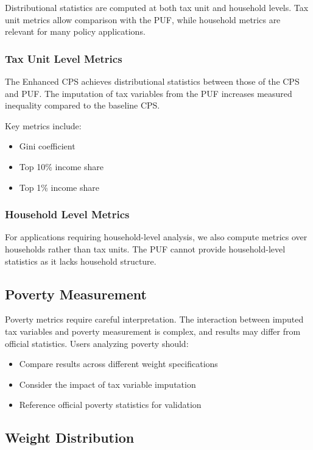 Distributional statistics are computed at both tax unit and household levels. Tax unit metrics allow comparison with the PUF, while household metrics are relevant for many policy applications.

\subsubsection{Tax Unit Level Metrics}

The Enhanced CPS achieves distributional statistics between those of the CPS and PUF. The imputation of tax variables from the PUF increases measured inequality compared to the baseline CPS.

Key metrics include:
\begin{itemize}
\item Gini coefficient
\item Top 10\% income share  
\item Top 1\% income share
\end{itemize}

\subsubsection{Household Level Metrics}

For applications requiring household-level analysis, we also compute metrics over households rather than tax units. The PUF cannot provide household-level statistics as it lacks household structure.

\subsection{Poverty Measurement}

Poverty metrics require careful interpretation. The interaction between imputed tax variables and poverty measurement is complex, and results may differ from official statistics. Users analyzing poverty should:

\begin{itemize}
\item Compare results across different weight specifications
\item Consider the impact of tax variable imputation
\item Reference official poverty statistics for validation
\end{itemize}

\subsection{Weight Distribution}

